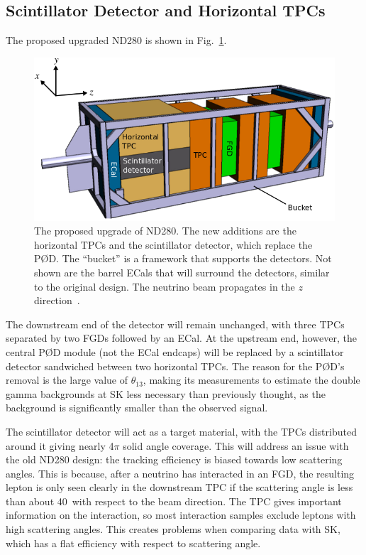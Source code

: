 \documentclass[aps,pra,12pt,notitlepage,tightenlines]{revtex4-1}
\begin{document}
\subsection{Scintillator Detector and Horizontal TPCs}
The proposed upgraded ND280 is shown in Fig.~\ref{fig:up}.
\begin{figure}
 \includegraphics[scale=0.5]{upgrade2.png}
 \caption{The proposed upgrade of ND280. The new additions are the horizontal TPCs and the scintillator detector, which replace the P\O D. The ``bucket'' is a framework that supports the detectors. Not shown are the barrel ECals that will surround the detectors, similar to the original design. The neutrino beam propagates in the $z$ direction~\cite{Blondel:2299599}.}
 \label{fig:up}
\end{figure}
The downstream end of the detector will remain unchanged, with three TPCs separated by two FGDs followed by an ECal. At the upstream end, however, the central P\O D module (not the ECal endcaps) will be replaced by a scintillator detector sandwiched between two horizontal TPCs. The reason for the P\O D's removal is the large value of $\theta_{13}$, making its measurements to estimate the double gamma backgrounds at SK less necessary than previously thought, as the background is significantly smaller than the observed signal. 

The scintillator detector will act as a target material, with the TPCs distributed around it giving nearly 4$\pi$ solid angle coverage. This will address an issue with the old ND280 design: the tracking efficiency is biased towards low scattering angles. This is because, after a neutrino has interacted in an FGD, the resulting lepton is only seen clearly in the downstream TPC if the scattering angle is less than about 40\degree\ with respect to the beam direction. The TPC gives important information on the interaction, so most interaction samples exclude leptons with high scattering angles. This creates problems when comparing data with SK, which has a flat efficiency with respect to scattering angle.
\end{document}
